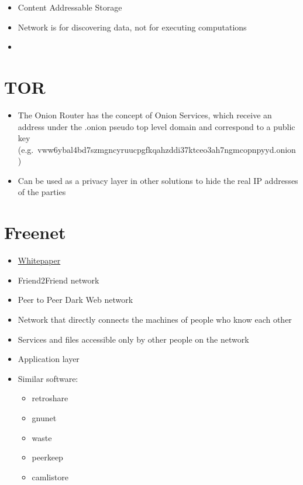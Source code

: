 \begin{itemize}
\tightlist
\item
  Content Addressable Storage
\item
  Network is for discovering data, not for executing computations
\item
\end{itemize}

\hypertarget{notes__02130-tor.md}{}
\hypertarget{notes__02130-tor.md__tor}{%
\section{TOR}\label{notes__02130-tor.md__tor}}

\begin{itemize}
\tightlist
\item
  The Onion Router has the concept of Onion Services, which receive an
  address under the .onion pseudo top level domain and correspond to a
  public key
  (e.g.~vww6ybal4bd7szmgncyruucpgfkqahzddi37ktceo3ah7ngmcopnpyyd.onion)
\item
  Can be used as a privacy layer in other solutions to hide the real IP
  addresses of the parties
\end{itemize}

\hypertarget{notes__02140-freenet.md}{}
\hypertarget{notes__02140-freenet.md__freenet}{%
\section{Freenet}\label{notes__02140-freenet.md__freenet}}

\begin{itemize}
\tightlist
\item
  \href{https://homepage.divms.uiowa.edu/~ghosh/freenet.pdf}{Whitepaper}
\item
  Friend2Friend network
\item
  Peer to Peer Dark Web network
\item
  Network that directly connects the machines of people who know each
  other
\item
  Services and files accessible only by other people on the network
\item
  Application layer
\item
  Similar software:

  \begin{itemize}
  \tightlist
  \item
    retroshare
  \item
    gnunet
  \item
    waste
  \item
    peerkeep
  \item
    camlistore
  \end{itemize}
\end{itemize}

